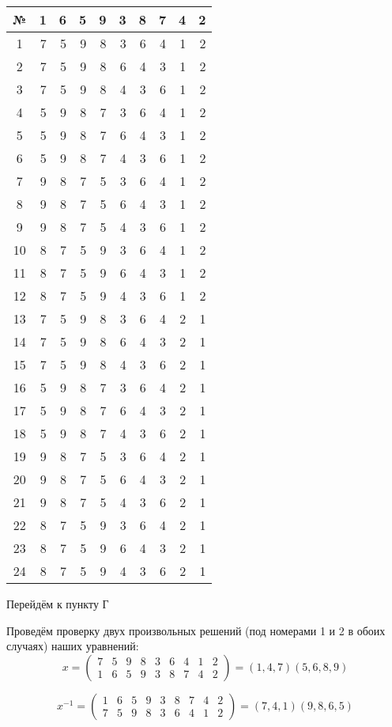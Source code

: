 \documentclass[utf8,14pt,a4paper,oneside,russian]{book}
\begin{document}
	\begin{longtable}{c|rrrr|rrr|r|r}
		№&1&6&5&9&3&8&7&4&2\\\hline
		1&7&5&9&8&3&6&4&1&2\\
		2&7&5&9&8&6&4&3&1&2\\
		3&7&5&9&8&4&3&6&1&2\\
		4&5&9&8&7&3&6&4&1&2\\
		5&5&9&8&7&6&4&3&1&2\\
		6&5&9&8&7&4&3&6&1&2\\
		7&9&8&7&5&3&6&4&1&2\\
		8&9&8&7&5&6&4&3&1&2\\
		9&9&8&7&5&4&3&6&1&2\\
		10&8&7&5&9&3&6&4&1&2\\
		11&8&7&5&9&6&4&3&1&2\\
		12&8&7&5&9&4&3&6&1&2\\
		13&7&5&9&8&3&6&4&2&1\\
		14&7&5&9&8&6&4&3&2&1\\
		15&7&5&9&8&4&3&6&2&1\\
		16&5&9&8&7&3&6&4&2&1\\
		17&5&9&8&7&6&4&3&2&1\\
		18&5&9&8&7&4&3&6&2&1\\
		19&9&8&7&5&3&6&4&2&1\\
		20&9&8&7&5&6&4&3&2&1\\
		21&9&8&7&5&4&3&6&2&1\\
		22&8&7&5&9&3&6&4&2&1\\
		23&8&7&5&9&6&4&3&2&1\\
		24&8&7&5&9&4&3&6&2&1\\
	\end{longtable}
	
	\vspace{\baselineskip}
	
	Перейдём к пункту Г
	
	Проведём проверку двух произвольных решений (под номерами 1 и 2 в обоих случаях) наших уравнений:
	\[ x = \left( 
	\begin{array}{ccccccccc}
	7&5&9&8&3&6&4&1&2\\
	1&6&5&9&3&8&7&4&2
	\end{array} 
	\right) = (1,4,7)(5,6,8,9) \]
	
	\[ x^{-1} = \left( 
	\begin{array}{ccccccccc}
	1&6&5&9&3&8&7&4&2\\
	7&5&9&8&3&6&4&1&2
	\end{array} 
	\right) = (7,4,1)(9,8,6,5) \]
	
\end{document}
